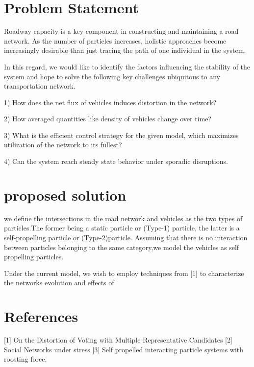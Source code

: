 \documentclass[15pt, onecolumn]{article}
\begin{document}
\section*{Problem Statement}
Roadway capacity is a key component in constructing and maintaining a road network. As the number of particles increases, holistic approaches become increasingly desirable than just tracing the path of one individual in the system. 


In this regard, we would like to identify the factors influencing the stability of the system and hope to solve the following key challenges ubiquitous to any transportation network.

1) How does the net flux of vehicles induces distortion in the network?

2) How averaged quantities like density of vehicles change over time?

3) What is the efficient control strategy for the given model, which maximizes utilization of the network to its fullest?

4) Can the system reach steady state behavior under sporadic disruptions.


\section*{proposed solution}
we define the intersections in the road network and vehicles as the two types of particles.The former being a static particle or (Type-1) particle, the latter is a self-propelling particle or (Type-2)particle. Assuming that there is no interaction between particles belonging to the same category,we model the vehicles as self propelling particles.

Under the current model, we wish to employ techniques from [1] to characterize the networks evolution and effects of      


\section*{References}
[1] On the Distortion of Voting with Multiple Representative Candidates
[2] Social Networks under stress
[3] Self propelled interacting particle systems with roosting force. 
    
\end{document}
